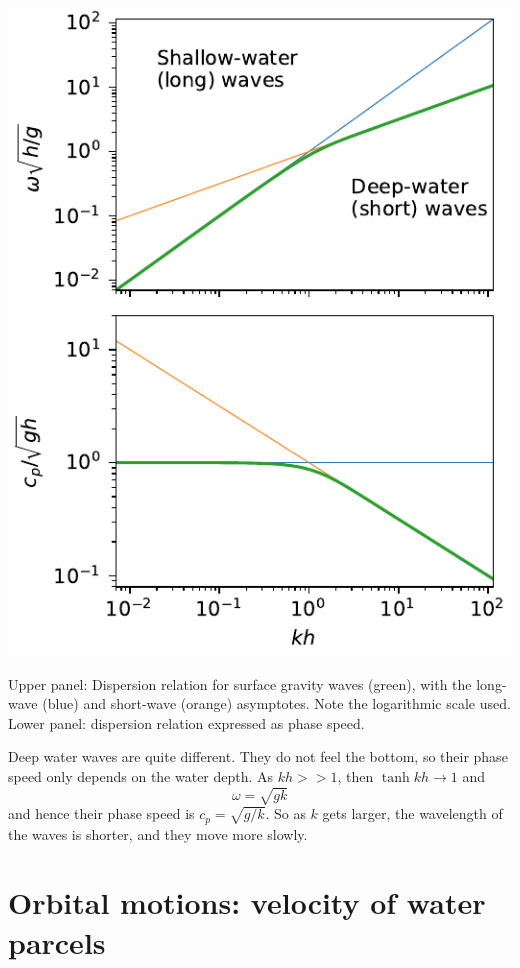 \begin{marginfigure}
 \includegraphics{figs/Waves/DispersionRelation}
    \caption{Upper panel: Dispersion relation for surface gravity waves (green), with the long-wave (blue) and short-wave (orange) asymptotes.  Note the logarithmic scale used. Lower panel: dispersion relation expressed as phase speed.   }
    \label{fig:DispersionRelation}  
\end{marginfigure}

Deep water waves are quite different.  They do not feel the bottom, so their phase speed only depends on the water depth.  As $kh>>1$, then $\tanh kh \to 1$ and 
\begin{equation}
  \omega = \sqrt{gk}    
\end{equation}
and hence their phase speed is $c_p = \sqrt{g/k}$.  So as $k$ gets larger, the wavelength of the waves is shorter, and they move more slowly.  


\section{Orbital motions: velocity of water parcels}

